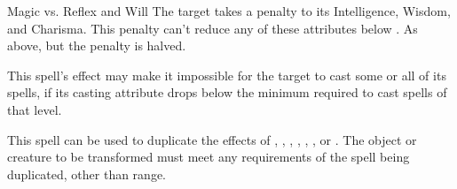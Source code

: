 \begin{spellheader}
    \begin{spelltargetinginfo}
    \end{spelltargetinginfo}
\end{spellheader}
\begin{spellcontent}
    \begin{spelleffects}
        \begin{spellattack}{Magic vs. Reflex and Will}
            \spellsuccess[Reflex] The target takes a  penalty to its Intelligence, Wisdom, and Charisma. This penalty can't reduce any of these attributes below .
            \spellfailure[Will] As above, but the penalty is halved.
        \end{spellattack}
        \spelldur{\durshort}
    \end{spelleffects}
\end{spellcontent}
\begin{spellfooter}
    \spellnotes This spell's effect may make it impossible for the target to cast some or all of its spells, if its casting attribute drops below the minimum required to cast spells of that level.
\end{spellfooter}

\begin{spellheader}
    \spellrng{\rngmed}
\end{spellheader}
\begin{spellcontent}
    \spellspecial This spell can be used to duplicate the effects of , , , , , , or . The object or creature to be transformed must meet any requirements of the spell being duplicated, other than range.
\end{spellcontent}
\begin{spellfooter}

\end{spellfooter}

